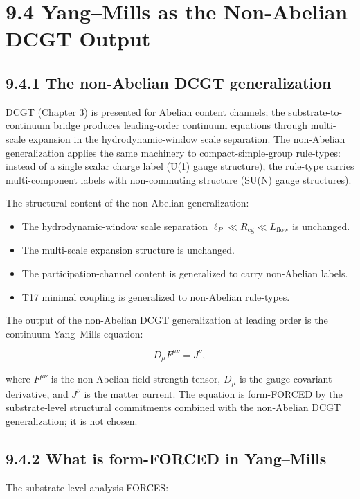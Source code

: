 \documentclass[11pt]{book}
\begin{document}
\section{9.4 Yang–Mills as the Non-Abelian DCGT Output}

\subsection{9.4.1 The non-Abelian DCGT generalization}

DCGT (Chapter 3) is presented for Abelian content channels; the substrate-to-continuum bridge produces leading-order continuum equations through multi-scale expansion in the hydrodynamic-window scale separation. The non-Abelian generalization applies the same machinery to compact-simple-group rule-types: instead of a single scalar charge label (U(1) gauge structure), the rule-type carries multi-component labels with non-commuting structure (SU(N) gauge structures).

The structural content of the non-Abelian generalization:
\begin{itemize}
\item The hydrodynamic-window scale separation $\ell_P \ll R_\mathrm{cg} \ll L_\mathrm{flow}$ is unchanged.
\item The multi-scale expansion structure is unchanged.
\item The participation-channel content is generalized to carry non-Abelian labels.
\item T17 minimal coupling is generalized to non-Abelian rule-types.
\end{itemize}

The output of the non-Abelian DCGT generalization at leading order is the continuum Yang–Mills equation:

\[
D_\mu F^{\mu\nu} = J^\nu,
\]

where $F^{\mu\nu}$ is the non-Abelian field-strength tensor, $D_\mu$ is the gauge-covariant derivative, and $J^\nu$ is the matter current. The equation is form-FORCED by the substrate-level structural commitments combined with the non-Abelian DCGT generalization; it is not chosen.

\subsection{9.4.2 What is form-FORCED in Yang–Mills}

The substrate-level analysis FORCES:
\end{document}
